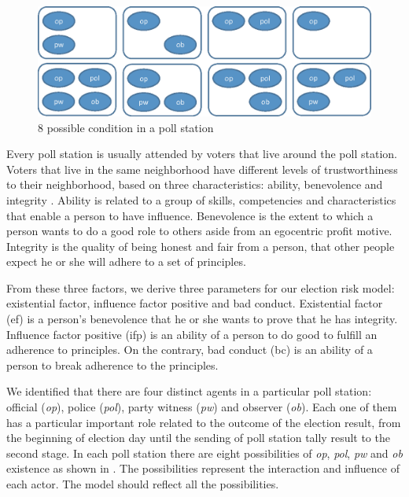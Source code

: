\documentclass[JIP]{ipsj}
\begin{document}
\begin{figure}[t]
\vbox{\large
  \hbox{\includegraphics[]{images/agents.eps}}}
\centerline{}
\caption{8 possible condition in a poll station}
\label{fig:8posinTPS}
\end{figure}

Every poll station is usually attended by voters that live around the poll station. Voters that live in the same neighborhood have different levels of trustworthiness to their neighborhood, based on three characteristics: ability, benevolence and integrity \cite{Mayer1995}. Ability is related to a group of skills, competencies and characteristics that enable a person to have influence. Benevolence is the extent to which a person wants to do a good role to others aside from an egocentric profit motive. Integrity is the quality of being honest and fair from a person, that other people expect he or she will adhere to a set of principles.

From these three factors, we derive three parameters for our election risk model: existential factor, influence factor positive and bad conduct. Existential factor (ef) is a person’s benevolence that he or she wants to prove that he has integrity. Influence factor positive (ifp) is an ability of a person to do good to fulfill an adherence to principles. On the contrary, bad conduct (bc) is an ability of a person to break adherence to the principles.

We identified that there are four distinct agents in a particular poll station: official (\textit{op}), police (\textit{pol}), party witness (\textit{pw}) and observer (\textit{ob}). Each one of them has a particular important role related to the outcome of the election result, from the beginning of election day until the sending of poll station tally result to the second stage. In each poll station there are eight possibilities of \textit{op}, \textit{pol}, \textit{pw} and \textit{ob} existence as shown in . The possibilities represent the interaction and influence of each actor. The model should reflect all the possibilities.
\end{document}
